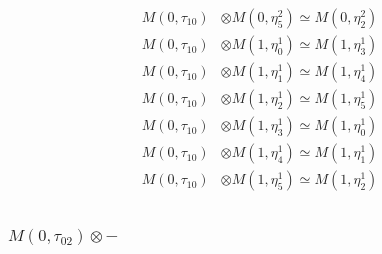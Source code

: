 \begin{align*}
M(0,\tau_{10}) &\otimes M(0,\eta^{2}_{5}) \simeq M(0,\eta^{2}_{2}) \\
M(0,\tau_{10}) &\otimes M(1,\eta^{1}_{0}) \simeq M(1,\eta^{1}_{3}) \\
M(0,\tau_{10}) &\otimes M(1,\eta^{1}_{1}) \simeq M(1,\eta^{1}_{4}) \\
M(0,\tau_{10}) &\otimes M(1,\eta^{1}_{2}) \simeq M(1,\eta^{1}_{5}) \\
M(0,\tau_{10}) &\otimes M(1,\eta^{1}_{3}) \simeq M(1,\eta^{1}_{0}) \\
M(0,\tau_{10}) &\otimes M(1,\eta^{1}_{4}) \simeq M(1,\eta^{1}_{1}) \\
M(0,\tau_{10}) &\otimes M(1,\eta^{1}_{5}) \simeq M(1,\eta^{1}_{2}) \\
\end{align*}

\subsubsection{$ M(0,\tau_{02})\otimes -$}
